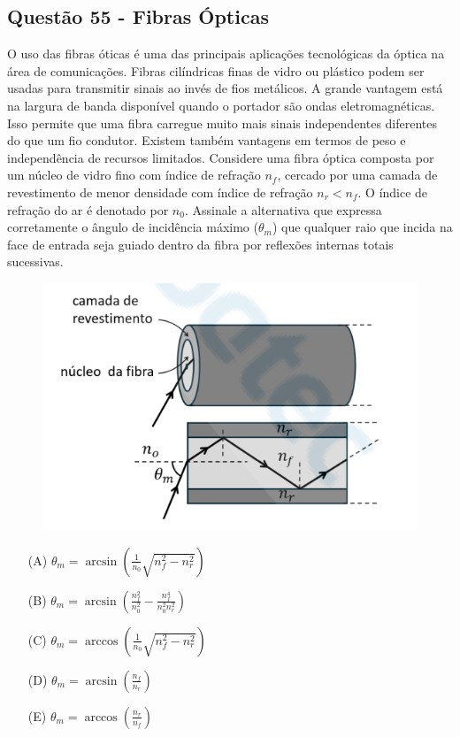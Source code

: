\documentclass[a4paper,12pt]{article}
\begin{document}
\begin{flushleft}
\subsection{Quest\~ao 55 - Fibras \'Opticas}
\noindent

O uso das fibras óticas é uma das principais aplicações tecnológicas da óptica na área
de comunicações. Fibras cilíndricas finas de vidro ou plástico podem ser usadas para transmitir sinais
ao invés de fios metálicos. A grande vantagem está na largura de banda disponível quando o portador
são ondas eletromagnéticas. Isso permite que uma fibra carregue muito mais sinais independentes
diferentes do que um fio condutor. Existem também vantagens em termos de peso e independência
de recursos limitados. Considere uma fibra óptica composta por um núcleo de vidro fino com índice
de refração \(n_f\), cercado por uma camada de revestimento de menor densidade com índice de refração
\(n_r < n_f\). O índice de refração do ar é denotado por \(n_0\). Assinale a alternativa que expressa
corretamente o ângulo de incidência máximo (\(\theta_m\)) que qualquer raio que incida na face de entrada
seja guiado dentro da fibra por reflexões internas totais sucessivas.

\begin{figure}[!h]
  \centering
  \includegraphics[scale=0.6]{figures/reflexao_total.png}
\end{figure}

\begin{itemize}
\item[(A)] \(\displaystyle \theta_m=\arcsin\!\left(\frac{1}{n_0}\sqrt{n_f^2-n_r^2}\right)\)
\item[(B)] \(\displaystyle \theta_m=\arcsin\!\left(\frac{n_f^2}{n_0^2}-\frac{n_f^4}{n_0^2 n_r^2}\right)\)
\item[(C)] \(\displaystyle \theta_m=\arccos\!\left(\frac{1}{n_0}\sqrt{n_f^2-n_r^2}\right)\)
\item[(D)] \(\displaystyle \theta_m=\arcsin\!\left(\frac{n_f}{n_r}\right)\)
\item[(E)] \(\displaystyle \theta_m=\arccos\!\left(\frac{n_r}{n_f}\right)\)
\end{itemize}


\end{flushleft}
\end{document}
